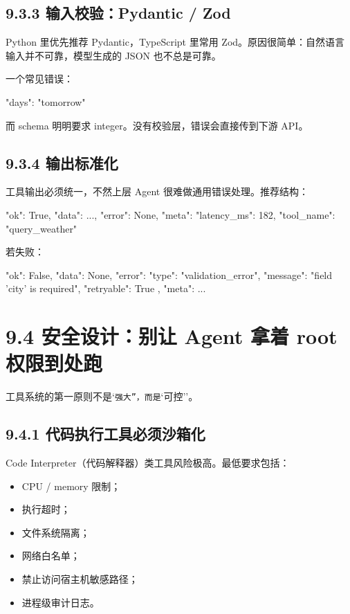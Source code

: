 \subsection{9.3.3 输入校验：Pydantic / Zod}

Python 里优先推荐 Pydantic，TypeScript 里常用 Zod。原因很简单：自然语言输入并不可靠，模型生成的 JSON 也不总是可靠。


一个常见错误：


\begin{codeblock}
{"days": "tomorrow"}
\end{codeblock}

而 schema 明明要求 integer。没有校验层，错误会直接传到下游 API。


\subsection{9.3.4 输出标准化}

工具输出必须统一，不然上层 Agent 很难做通用错误处理。推荐结构：


\begin{codeblock}
{
    "ok": True,
    "data": {...},
    "error": None,
    "meta": {
        "latency_ms": 182,
        "tool_name": "query_weather"
    }
}
\end{codeblock}

若失败：


\begin{codeblock}
{
    "ok": False,
    "data": None,
    "error": {
        "type": "validation_error",
        "message": "field 'city' is required",
        "retryable": True
    },
    "meta": {...}
}
\end{codeblock}

\section{9.4 安全设计：别让 Agent 拿着 root 权限到处跑}

工具系统的第一原则不是`\texttt{强大''，而是}`可控''。


\subsection{9.4.1 代码执行工具必须沙箱化}

Code Interpreter（代码解释器）类工具风险极高。最低要求包括：


\begin{itemize}[leftmargin=2em]
\item CPU / memory 限制；
\item 执行超时；
\item 文件系统隔离；
\item 网络白名单；
\item 禁止访问宿主机敏感路径；
\item 进程级审计日志。
\end{itemize}

